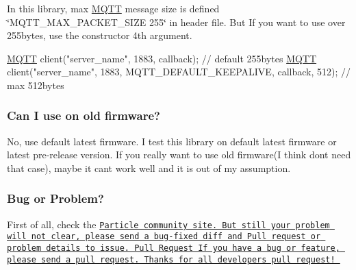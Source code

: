 In this library, max \hyperlink{class_m_q_t_t}{M\+Q\+TT} message size is defined \char`\"{}\+M\+Q\+T\+T\+\_\+\+M\+A\+X\+\_\+\+P\+A\+C\+K\+E\+T\+\_\+\+S\+I\+Z\+E 255\char`\"{} in header file. But If you want to use over 255bytes, use the constructor 4th argument. 
\begin{DoxyPre}
    \hyperlink{class_m_q_t_t}{MQTT} client("server\_name", 1883, callback); // default 255bytes
    \hyperlink{class_m_q_t_t}{MQTT} client("server\_name", 1883, MQTT\_DEFAULT\_KEEPALIVE, callback, 512); // max 512bytes
\end{DoxyPre}


\subsubsection*{Can I use on old firmware?}

No, use default latest firmware. I test this library on default latest firmware or latest pre-\/release version. If you really want to use old firmware(I think don\textquotesingle{}t need that case), maybe it can\textquotesingle{}t work well and it is out of my assumption.

\subsubsection*{Bug or Problem?}

First of all, check the \href{https://community.particle.io/}{\tt Particle community site. But still your problem will not clear, please send a bug-\/fixed diff and Pull request or problem details to issue. Pull Request If you have a bug or feature, please send a pull request. Thanks for all developer\textquotesingle{}s pull request! }